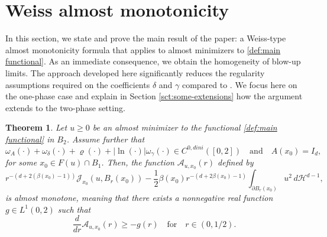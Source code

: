 \documentclass[reqno,11pt]{amsart}
\newtheorem{theorem}{Theorem}[section]
\newcommand{\1}{\mathds{1}}  %
\numberwithin{equation}{section}
\begin{document}
\section{Weiss almost monotonicity}\label{sct:almost-monotone-formula}

In this section, we state and prove the main result of the paper: a Weiss-type almost monotonicity formula that applies to almost minimizers to \eqref{def:main functional}. As an immediate consequence, we obtain the homogeneity of blow-up limits. The approach developed here significantly reduces the regularity assumptions required on the coefficients $\delta$ and $\gamma$ compared to \cite{ASTU1}. We focus here on the one-phase case and explain in Section \ref{sct:some-extensions} how the argument extends to the two-phase setting.

\begin{theorem}\label{thm:almost-monotonicity}
Let $u \geq 0$ be an almost minimizer to the functional \eqref{def:main functional} in $B_2$. Assume further that
\[
	\omega_A(\cdot) + \omega_\delta(\cdot) + \varrho(\cdot) + |\ln(\cdot)|\omega_\gamma(\cdot) \in C^{0,dini} ([0,2])\quad \text{and} \quad A(x_0) = I_d,
\]
for some $x_0 \in F(u)\cap B_1$. Then, the function $\mathcal{A}_{u,x_0}(r)$ defined by
\[
     r^{-(d + 2(\beta(x_0) - 1))}\mathcal{J}_{x_0}(u,B_r(x_0)) - \frac{1}{2}\beta(x_0)r^{-(d + 2\beta(x_0) -1)}\int_{\partial B_r(x_0)}u^2\, d\mathcal{H}^{d-1},
\]
is almost monotone, meaning that there exists a nonnegative real function $g \in L^1(0,2)$ such that
\[
	\frac{d}{dr} \mathcal{A}_{u,x_0}(r) \geq -g(r) \quad \text{for} \quad r \in (0,1/2).
\]
\end{theorem}
\end{document}
